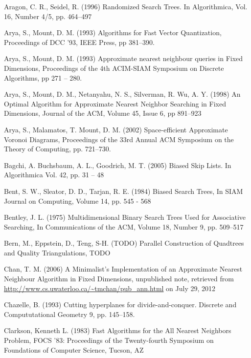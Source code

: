 \documentclass[mcs]{scsthesis}
\begin{document}
\begin{thebibliography}{5}

Aragon, C. R.,  Seidel, R. (1996) Randomized Search Trees.
In Algorithmica, Vol. 16, Number 4/5, pp. 464--497

Arya, S., Mount, D. M. (1993) Algorithms for Fast Vector Quantization,
Proceedings of DCC '93, IEEE Press, pp 381--390. 

Arya, S., Mount, D. M. (1993) Approximate nearest neighbour queries in Fixed
Dimensions, Proceedings of the 4th ACIM-SIAM Symposium on Discrete Algorithms,
pp 271 -- 280.

Arya, S., Mount, D. M., Netanyahu, N. S., Silverman, R. Wu, A. Y. (1998)
An Optimal Algorithm for Approximate Nearest Neighbor Searching in Fixed
Dimensions, Journal of the ACM, Volume 45, Issue 6, pp 891--923

Arya, S., Malamatos, T. Mount, D. M. (2002) Space-efficient Approximate
Voronoi Diagrams, Proceedings of the 33rd Annual ACM Symposium on the Theory
of Computing, pp. 721--730.

Bagchi, A. Buchsbaum, A. L., Goodrich, M. T. (2005) Biased Skip Lists.
In Algorithmica Vol. 42, pp. 31 – 48

Bent, S. W., Sleator, D. D., Tarjan, R. E. (1984) Biased Search Trees,
In SIAM Journal on Computing, Volume 14, pp. 545 - 568

Bentley, J. L. (1975) Multidimensional Binary Search Trees Used for Associative
Searching, In Communications of the ACM, Volume 18, Number 9, pp. 509--517 

Bern, M., Eppstein, D., Teng, S-H. (TODO) Parallel Construction of Quadtrees and
Quality Triangulations, TODO

Chan, T. M. (2006) A Minimalist's Implementation of an Approximate Nearest
Neighbour Algorithm in Fixed Dimensions, unpublished note, retrieved from
\url{http://www.cs.uwaterloo.ca/~tmchan/pub\_ann.html} on July 29, 2012

 Chazelle, B. (1993) Cutting hyperplanes for divide-and-conquer.
Discrete and Compututational Geometry 9, pp. 145--158.

Clarkson, Kenneth L. (1983) Fast Algorithms for the All Nearest Neighbors Problem,
FOCS '83: Proceedings of the Twenty-fourth Symposium on Foundations of Computer Science,
Tucson, AZ 


\end{thebibliography}
\end{document}
